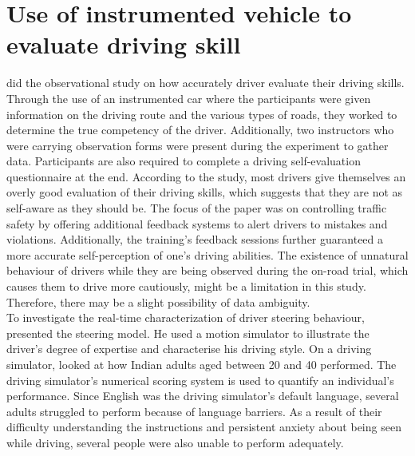 \documentclass[12pt,letterpaper]{report}
\begin{document}
\section{Use of instrumented vehicle to evaluate driving skill}
\textbf{\cite{amado2014accurately}} did the observational study on how accurately driver evaluate their driving skills. Through the use of an instrumented car where the participants were given information on the driving route and the various types of roads, they worked to determine the true competency of the driver. Additionally, two instructors who were carrying observation forms were present during the experiment to gather data. Participants are also required to complete a driving self-evaluation questionnaire at the end. According to the study, most drivers give themselves an overly good evaluation of their driving skills, which suggests that they are not as self-aware as they should be. The focus of the paper was on controlling traffic safety by offering additional feedback systems to alert drivers to mistakes and violations. Additionally, the training's feedback sessions further guaranteed a more accurate self-perception of one's driving abilities. The existence of unnatural behaviour of drivers while they are being observed during the on-road trial, which causes them to drive more cautiously, might be a limitation in this study. Therefore, there may be a slight possibility of data ambiguity.\\


To investigate the real-time characterization of driver steering behaviour, \textbf{\cite{best2019real}} presented the steering model. He used a motion simulator to illustrate the driver's degree of expertise and characterise his driving style. On a driving simulator, \textbf{\cite{ahirwal2019assessment}} looked at how Indian adults aged between 20 and 40 performed. The driving simulator's numerical scoring system is used to quantify an individual's performance. Since English was the driving simulator's default language, several adults struggled to perform because of language barriers. As a result of their difficulty understanding the instructions and persistent anxiety about being seen while driving, several people were also unable to perform adequately.\\
\end{document}
